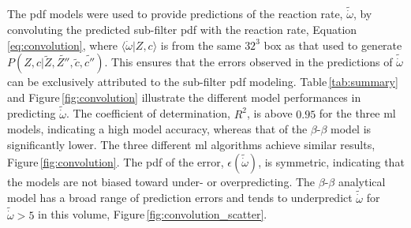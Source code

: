 \documentclass[review]{elsarticle}
\newcommand{\wt}[1]{\widetilde{#1}}
\begin{document}
The \gls{pdf} models were used to provide predictions of the reaction rate,
$\wt{\dot{\omega}}$, by convoluting the predicted sub-filter \gls{pdf} with
the reaction rate, Equation\,\ref{eq:convolution}, where
$\langle \dot{\omega} | Z, c \rangle$ is from the same $32^3$ box as
that used to generate $P(Z,c | \wt{Z}, \wt{Z''}, \wt{c},
\wt{c''})$. This ensures that the errors observed in the predictions of
$\wt{\dot{\omega}}$ can be exclusively attributed to the sub-filter
\gls{pdf} modeling. Table\,\ref{tab:summary} and
Figure\,\ref{fig:convolution} illustrate the different model
performances in predicting $\wt{\dot{\omega}}$. The coefficient of
determination, $R^2$, is above $0.95$ for the three \gls{ml}
models, indicating a high model accuracy, whereas that of the
$\beta$-$\beta$ model is significantly lower. The three different
\gls{ml} algorithms achieve similar results,
Figure\,\ref{fig:convolution}. The \gls{pdf} of the error,
$\epsilon(\wt{\dot{\omega}})$, is symmetric, indicating that the
models are not biased toward under- or overpredicting. The
$\beta$-$\beta$ analytical model has a broad range of prediction errors
and tends to underpredict $\wt{\dot{\omega}}$ for
$\wt{\dot{\omega}} > 5$ in this volume,
Figure\,\ref{fig:convolution_scatter}.
\end{document}
